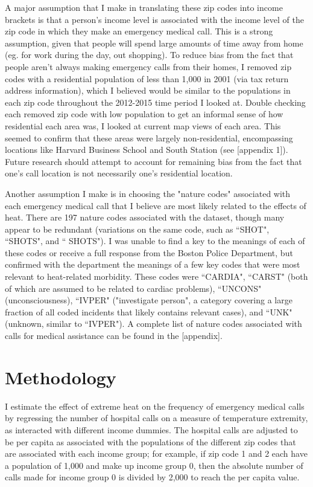 \documentclass[11pt, oneside]{article}      %
\begin{document}
A major assumption that I make in translating these zip codes into income brackets is that a person's income level is associated with the income level of the zip code in which they make an emergency medical call. This is a strong assumption, given that people will spend large amounts of time away from home (eg. for work during the day, out shopping). To reduce bias from the fact that people aren't always making emergency calls from their homes, I removed zip codes with a residential population of less than 1,000  in 2001 (via tax return address information), which I believed would be similar to the populations in each zip code throughout the 2012-2015 time period I looked at. Double checking each removed zip code with low population to get an informal sense of how residential each area was, I looked at current map views of each area. This seemed to confirm that these areas were largely non-residential, encompassing locations like Harvard Business School and South Station (see [appendix 1]). Future research should attempt to account for remaining bias from the fact that one's call location is not necessarily one's residential location.

Another assumption I make is in choosing the "nature codes" associated with each emergency medical call that I believe are most likely related to the effects of heat. There are 197 nature codes associated with the dataset, though many appear to be redundant (variations on the same code, such as ``SHOT", ``SHOTS", and `` SHOTS"). I was unable to find a key to the meanings of each of these codes or receive a full response from the Boston Police Department, but confirmed with the department the meanings of a few key codes that were most relevant to heat-related morbidity. These codes were ``CARDIA", ``CARST" (both of which are assumed to be related to cardiac problems), ``UNCONS" (unconsciousness), ``IVPER" ("investigate person", a category covering a large fraction of all coded incidents that likely contains relevant cases), and ``UNK" (unknown, similar to ``IVPER"). A complete list of nature codes associated with calls for medical assistance can be found in the [appendix].


\section{Methodology}
I estimate the effect of extreme heat on the frequency of emergency medical calls by regressing the number of hospital calls on a measure of temperature extremity, as interacted with different income dummies. The hospital calls are adjusted to be per capita as associated with the populations of the different zip codes that are associated with each income group; for example, if zip code 1 and 2 each have a population of 1,000 and make up income group 0, then the absolute number of calls made for income group 0 is divided by 2,000 to reach the per capita value.
\end{document}
